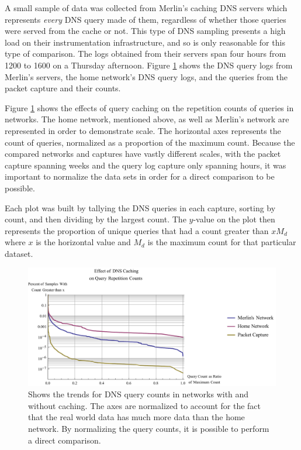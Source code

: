 \documentclass[12pt]{report}
\theoremstyle{remark}
\theoremstyle{definition}
\theoremstyle{definition}
\theoremstyle{definition}
\begin{document}
A small sample of data was collected from Merlin's caching DNS servers which
represents \emph{every} DNS query made of them, regardless of whether those
queries were served from the cache or not. This type of DNS sampling presents a
high load on their instrumentation infrastructure, and so is only reasonable for
this type of comparison. The logs obtained from their servers span four hours
from 1200 to 1600 on a Thursday afternoon. Figure \ref{caching} shows the DNS
query logs from Merlin's servers, the home network's DNS query logs, and the
queries from the packet capture and their counts.

Figure \ref{caching} shows the effects of query caching on the repetition counts
of queries in networks. The home network, mentioned above, as well as Merlin's
network are represented in order to demonstrate scale. The horizontal axes
represents the count of queries, normalized as a proportion of the maximum
count. Because the compared networks and captures have vastly different scales,
with the packet capture spanning weeks and the query log capture only spanning
hours, it was important to normalize the data sets in order for a direct
comparison to be possible.

Each plot was built by tallying the DNS queries in each capture, sorting by
count, and then dividing by the largest count. The $y$-value on the plot then
represents the proportion of unique queries that had a count greater than $xM_d$
where $x$ is the horizontal value and $M_d$ is the maximum count for that particular
dataset.

\begin{figure}[h]
\centering
\includegraphics[width=\textwidth]{../figures/caching.pdf}
\caption[Effect of DNS Caching on Query Counts]{Shows the trends for DNS query
counts in networks with and without caching. The axes are normalized to account
for the fact that the real world data has much more data than the home network.
By normalizing the query counts, it is possible to perform a direct comparison.}
\label{caching}
\end{figure}
\end{document}

